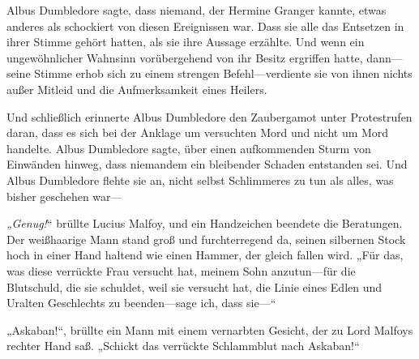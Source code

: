 Albus Dumbledore sagte, dass niemand, der Hermine Granger kannte, etwas anderes als schockiert von diesen Ereignissen war. Dass sie alle das Entsetzen in ihrer Stimme gehört hatten, als sie ihre Aussage erzählte. Und wenn ein ungewöhnlicher Wahnsinn vorübergehend von ihr Besitz ergriffen hatte, dann—seine Stimme erhob sich zu einem strengen Befehl—verdiente sie von ihnen nichts außer Mitleid und die Aufmerksamkeit eines Heilers.

Und schließlich erinnerte Albus Dumbledore den Zaubergamot unter Protestrufen daran, dass es sich bei der Anklage um versuchten Mord und nicht um Mord handelte. Albus Dumbledore sagte, über einen aufkommenden Sturm von Einwänden hinweg, dass niemandem ein bleibender Schaden entstanden sei. Und Albus Dumbledore flehte sie an, nicht selbst Schlimmeres zu tun als alles, was bisher geschehen war—

\emph{„Genug!}“ brüllte Lucius Malfoy, und ein Handzeichen beendete die Beratungen. Der weißhaarige Mann stand groß und furchterregend da, seinen silbernen Stock hoch in einer Hand haltend wie einen Hammer, der gleich fallen wird. „Für das, was diese verrückte Frau versucht hat, meinem Sohn anzutun—für die Blutschuld, die sie schuldet, weil sie versucht hat, die Linie eines Edlen und Uralten Geschlechts zu beenden—sage ich, dass sie—“

„Askaban!“, brüllte ein Mann mit einem vernarbten Gesicht, der zu Lord Malfoys rechter Hand saß. „Schickt das verrückte Schlammblut nach Askaban!“


